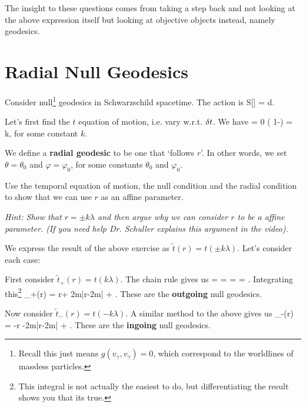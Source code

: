 The insight to these questions comes from taking a step back and not looking at the above expression itself but looking at objective objects instead, namely geodesics. 

\section{Radial Null Geodesics}

Consider null\footnote{Recall this just means $g(v_{\gamma},v_{\gamma})=0$, which correspond to the worldlines of massless particles.} geodesics in Schwarzschild spacetime. The action is 
\bse 
    S[\gamma] = \int d\lambda {}.
\ese 

Let's first find the $t$ equation of motion, i.e. vary w.r.t. $\delta t$. We have 
\bse 
      = 0 \qquad \iff \qquad \bigg( 1-\bigg) = k,
\ese 
for some constant $k$.

    We define a \textbf{radial geodesic} to be one that `follows $r$'. In other words, we set $\theta = \theta_0$ and $\varphi = \varphi_0$, for some constants $\theta_0$ and $\varphi_0$.
\ed 

\bbox
    Use the temporal equation of motion, the null condition and the radial condition to show that we can use $r$ as an affine parameter. 
    
    \textit{Hint: Show that $r=\pm k \lambda$ and then argue why we can consider $r$ to be a affine parameter. (If you need help Dr. Schuller explains this argument in the video).}
\ebox 

We express the result of the above exercise as $\widetilde{t}(r) = t(\pm k\lambda)$. Let's consider each case: 
\benr 
    \item First consider $\widetilde{t}_+(r) = t(k\lambda)$. The chain rule gives us
    \bse 
         =  =  =  = . 
    \ese
    Integrating this\footnote{This integral is not actually the easiest to do, but differentiating the result shows you that its true.} 
    \bse 
        _+(r) = r+ 2m\ln\big|r-2m\big| + .
    \ese 
    These are the \textbf{outgoing} null geodesics.
    \item Now consider $\widetilde{t}_-(r) = t(-k\lambda)$. A similar method to the above gives us
    \bse 
        _-(r) = -r -2m\ln\big|r-2m\big| + .
    \ese 
    These are the \textbf{ingoing} null geodesics.
\een 

